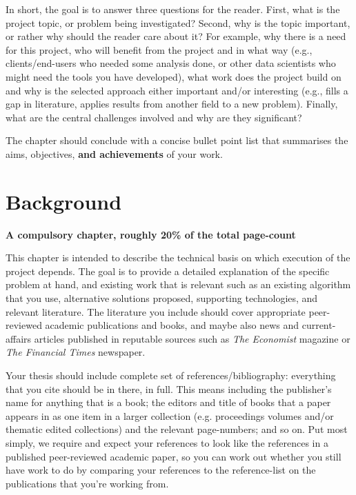\documentclass[ %
                    author={James Stephenson},
                supervisor={Dr. Edwin Simpson},
                    degree={MSc},
                     title={Bayesian Deep Learning For Extractive Test Summarisation},
                  subtitle={},
                      type={},
                      year={2023}]{../additions/dissertation}
\begin{document}
		In short, the goal is to answer three questions for the reader.  First, 
		what is the project topic, or problem being investigated?  Second, why 
		is the topic important, or rather why should the reader care about it?  
		For example, why there is a need for this project, who will benefit from the 
		project and in what way (e.g., clients/end-users who needed some analysis
		done, or other data scientists who might need the tools you have developed), what 
		work does the project build on and why is the selected approach either
		important and/or interesting (e.g., fills a gap in literature, applies
		results from another field to a new problem).  Finally, what are the 
		central challenges involved and why are they significant? 
		 
		The chapter should conclude with a concise bullet point list that 
		summarises the aims, objectives, {\bf and achievements}\/ of your work. 
		
	
	\chapter{Background}
	\label{chap:background}
		
		{\bf A compulsory chapter, roughly 20\% of the total page-count}
		\vspace{1cm} 
		
		\noindent
		This chapter is intended to describe the technical basis on which execution
		of the project depends.  The goal is to provide a detailed explanation of
		the specific problem at hand, and existing work that is relevant such as an
		existing algorithm that you use, alternative solutions proposed, supporting
		technologies, and relevant literature. The literature you include should cover 
		appropriate peer-reviewed academic publications and books, and maybe also 
		news and current-affairs articles published in reputable sources such as 
		{\em The Economist} magazine or {\em The Financial Times} newspaper. 
		
		Your thesis should include complete set of references/bibliography: everything that you cite should be in there, in full. This means including the publisher's name for anything that is a book; the editors and title of books that a paper appears in as one item in a larger collection (e.g. proceedings volumes and/or thematic edited collections) and the relevant page-numbers; and so on. Put most simply, we require and expect your references to look like the references in a published peer-reviewed academic paper, so you can work out whether you still have work to do by comparing your references to the reference-list on the publications that you're working from. 
		
\end{document}
